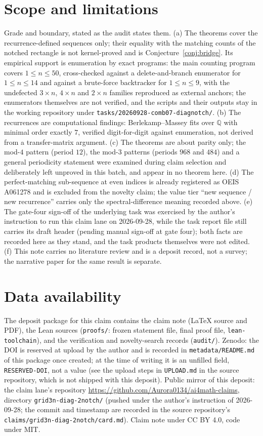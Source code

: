 \documentclass[11pt]{article}
\theoremstyle{definition}
\begin{document}
\section{Scope and limitations}

Grade and boundary, stated as the audit states them. (a) The theorems cover
the recurrence-defined sequences only; their equality with the matching counts
of the notched rectangle is not kernel-proved and is
Conjecture~\ref{conj:bridge}. Its empirical support is enumeration by exact
programs: the main counting program covers $1\le n\le 50$, cross-checked
against a delete-and-branch enumerator for $1\le n\le 14$ and against a
brute-force backtracker for $1\le n\le 9$, with the undefected $3\times n$,
$4\times n$ and $2\times n$ families reproduced as external anchors; the
enumerators themselves are not verified, and the scripts and their outputs
stay in the working repository under \texttt{tasks/20260928-comb07-diagnotch/}.
(b) The recurrences are computational findings: Berlekamp--Massey fits over
$\mathbb{Q}$ with minimal order exactly $7$, verified digit-for-digit against
enumeration, not derived from a transfer-matrix argument. (c) The theorems are
about parity only; the mod-$4$ pattern (period $12$), the mod-$3$ patterns
(periods $968$ and $484$) and a general periodicity statement were examined
during claim selection and deliberately left unproved in this batch, and
appear in no theorem here. (d) The perfect-matching sub-sequence at even
indices is already registered as OEIS A061278 and is excluded from the novelty
claim; the value tier ``new sequence / new recurrence'' carries only the
spectral-difference meaning recorded above. (e) The gate-four sign-off of the
underlying task was exercised by the author's instruction to run this claim
lane on 2026-09-28, while the task report file still carries its draft header
(pending manual sign-off at gate four); both facts are recorded here as they
stand, and the task products themselves were not edited. (f) This note carries
no literature review and is a deposit record, not a survey; the narrative
paper for the same result is separate.

\section*{Data availability}

The deposit package for this claim contains the claim note (LaTeX source and
PDF), the Lean sources (\texttt{proofs/}: frozen statement file, final proof
file, \texttt{lean-toolchain}), and the verification and novelty-search records
(\texttt{audit/}). Zenodo: the DOI is reserved at upload by the author and is
recorded in \texttt{metadata/README.md} of this package once created; at the
time of writing it is an unfilled field, \texttt{RESERVED-DOI}, not a value
(see the upload steps in \texttt{UPLOAD.md} in the source repository, which is
not shipped with this deposit). Public mirror of this deposit: the claim lane's repository
\url{https://github.com/Aurora0134/ai4math-claims}, directory
\texttt{grid3n-diag-2notch/} (pushed under the author's instruction of
2026-09-28; the commit and timestamp are recorded in the source repository's
\texttt{claims/grid3n-diag-2notch/card.md}).
Claim note under CC BY 4.0, code under MIT.
\end{document}

